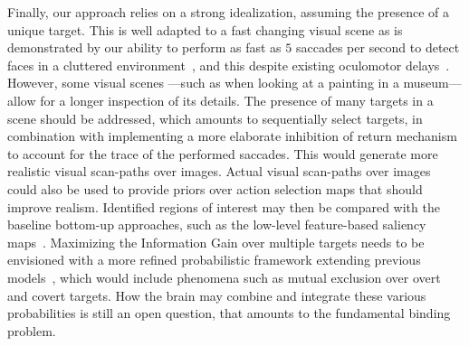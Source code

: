 Finally, our approach relies on a strong idealization, assuming the presence of a unique target. This is well adapted to a fast changing visual scene as is demonstrated by our ability to perform as fast as $5$ saccades per second to detect faces in a cluttered environment~\cite{Martin18}, and this despite existing oculomotor delays~\cite{PerrinetAdamsFriston14}. However, some visual scenes ---such as when looking at a painting in a museum--- allow for a longer inspection of its details. The presence of many targets in a scene should be addressed, which amounts to sequentially select targets, in combination with implementing a more elaborate inhibition of return mechanism to account for the trace of the performed saccades. This would generate more realistic visual scan-paths over images. Actual visual scan-paths over images could also be used to provide priors over action selection maps that should improve realism. Identified regions of interest may then be compared with the baseline bottom-up approaches, such as the low-level feature-based saliency maps~\cite{Itti01}. Maximizing the Information Gain over multiple targets needs to be envisioned with a more refined probabilistic framework extending previous models~\cite{Friston12}, which would include phenomena such as mutual exclusion over overt and covert targets. How the brain may combine and integrate these various probabilities is still an open question, that amounts to the fundamental binding problem. 
